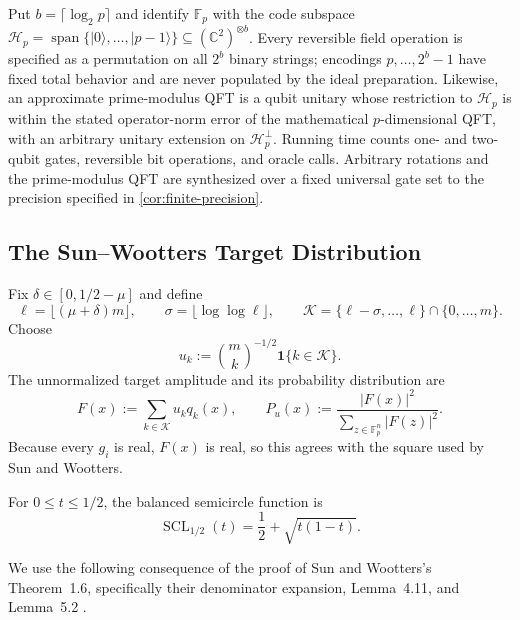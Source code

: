 \documentclass[10pt,a4paper]{amsart}
\newcommand{\F}{\mathbb{F}}
\newcommand{\Kcal}{\mathcal{K}}
\newcommand{\SCL}{\operatorname{SCL}}
\newcommand{\ket}[1]{\lvert #1\rangle}
\newcommand{\abs}[1]{\left\lvert #1\right\rvert}
\newcommand{\one}{\mathbf{1}}
\begin{document}
Put $b=\lceil\log_2p\rceil$ and identify $\F_p$ with the code subspace $\mathcal H_p=\operatorname{span}\{\ket0,\ldots,\ket{p-1}\}\subseteq(\mathbb C^2)^{\otimes b}$.  Every reversible field operation is specified as a permutation on all $2^b$ binary strings; encodings $p,\ldots,2^b-1$ have fixed total behavior and are never populated by the ideal preparation.  Likewise, an approximate prime-modulus QFT is a qubit unitary whose restriction to $\mathcal H_p$ is within the stated operator-norm error of the mathematical $p$-dimensional QFT, with an arbitrary unitary extension on $\mathcal H_p^\perp$.  Running time counts one- and two-qubit gates, reversible bit operations, and oracle calls.  Arbitrary rotations and the prime-modulus QFT are synthesized over a fixed universal gate set to the precision specified in \cref{cor:finite-precision}.

\subsection{The Sun--Wootters Target Distribution}

Fix $\delta\in[0,1/2-\mu]$ and define
\begin{equation}
   \ell=\lfloor(\mu+\delta)m\rfloor,
   \qquad
   \sigma=\lfloor\log\log\ell\rfloor,
   \qquad
   \Kcal=\{\ell-\sigma,\ldots,\ell\}\cap\{0,\ldots,m\}.
   \label{eq:shell}
\end{equation}
Choose
\begin{equation}
   u_k:=\binom{m}{k}^{-1/2}\one\{k\in\Kcal\}.
   \label{eq:weights}
\end{equation}
The unnormalized target amplitude and its probability distribution are
\begin{equation}
   F(x):=\sum_{k\in\Kcal}u_kq_k(x),
   \qquad
   P_u(x):=\frac{\abs{F(x)}^2}{\sum_{z\in\F_p^n}\abs{F(z)}^2}.
   \label{eq:Pu}
\end{equation}
Because every $g_i$ is real, $F(x)$ is real, so this agrees with the square used by Sun and Wootters.

For $0\le t\le1/2$, the balanced semicircle function is
\begin{equation}
   \SCL_{1/2}(t)=\frac12+\sqrt{t(1-t)}.
   \label{eq:scl}
\end{equation}

We use the following consequence of the proof of Sun and Wootters's Theorem~1.6, specifically their denominator expansion, Lemma~4.11, and Lemma~5.2 \cite{SunWootters2026}.
\end{document}
